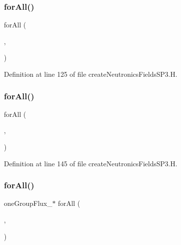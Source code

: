 \subsubsection{\texorpdfstring{for\+All()}{forAll()}\hspace{0.1cm}{\footnotesize\ttfamily [2/6]}}
{\footnotesize\ttfamily for\+All (\begin{DoxyParamCaption}\item[{flux\+Star\+\_\+}]{,  }\item[{fluxI}]{ }\end{DoxyParamCaption})}



Definition at line 125 of file create\+Neutronics\+Fields\+S\+P3.\+H.

\mbox{\label{createNeutronicsFieldsSP3_8H_aa0c22c740cc3ca65292322b90da4078e}} 
\subsubsection{\texorpdfstring{for\+All()}{forAll()}\hspace{0.1cm}{\footnotesize\ttfamily [3/6]}}
{\footnotesize\ttfamily for\+All (\begin{DoxyParamCaption}\item[{flux\+Star2\+\_\+}]{,  }\item[{fluxI}]{ }\end{DoxyParamCaption})}



Definition at line 145 of file create\+Neutronics\+Fields\+S\+P3.\+H.

\mbox{\label{createNeutronicsFieldsSP3_8H_ac61a9f70f5e91480e954d78dd7c78d2b}} 
\subsubsection{\texorpdfstring{for\+All()}{forAll()}\hspace{0.1cm}{\footnotesize\ttfamily [4/6]}}
{\footnotesize\ttfamily one\+Group\+Flux\+\_\+$\ast$ for\+All (\begin{DoxyParamCaption}\item[{flux\+\_\+}]{,  }\item[{energyI}]{ }\end{DoxyParamCaption})}



